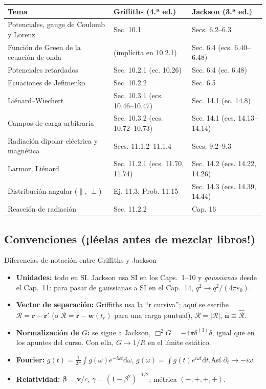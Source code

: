\documentclass[11pt,a4paper]{article}
\newcommand{\Rv}{\bm{\mathcal R}}
\newcommand{\Rs}{\mathcal R}
\newcommand{\Rh}{\hat{\bm{\mathcal R}}}
\newcommand{\nh}{\hat{\mathbf n}}
\newcommand{\bv}{\mathbf v}
\newcommand{\rr}{\mathbf r}
\newcommand{\dd}{\mathrm d}
\newcommand{\boxop}{\Box^2}
\newcommand{\bbeta}{\bm\beta}
\theoremstyle{remark}
\begin{document}
\begin{center}
\renewcommand{\arraystretch}{1.25}
\begin{tabularx}{\textwidth}{>{\raggedright}p{5.2cm}>{\raggedright}X>{\raggedright\arraybackslash}X}
\toprule
\textbf{Tema} & \textbf{Griffiths (4.ª ed.)} & \textbf{Jackson (3.ª ed.)}\\
\midrule
Potenciales, gauge de Coulomb y Lorenz & Sec. 10.1 & Secs. 6.2--6.3\\
Función de Green de la ecuación de onda & (implícita en 10.2.1) & Sec. 6.4 (ecs. 6.40--6.48)\\
Potenciales retardados & Sec. 10.2.1 (ec. 10.26) & Sec. 6.4 (ec. 6.48)\\
Ecuaciones de Jefimenko & Sec. 10.2.2 & Sec. 6.5\\
Liénard--Wiechert & Sec. 10.3.1 (ecs. 10.46--10.47) & Sec. 14.1 (ec. 14.8)\\
Campos de carga arbitraria & Sec. 10.3.2 (ecs. 10.72--10.73) & Sec. 14.1 (ecs. 14.13--14.14)\\
Radiación dipolar eléctrica y magnética & Secs. 11.1.2--11.1.4 & Secs. 9.2--9.3\\
Larmor, Liénard & Sec. 11.2.1 (ecs. 11.70, 11.74) & Sec. 14.2 (ecs. 14.22, 14.26)\\
Distribución angular ($\parallel$, $\perp$) & Ej. 11.3; Prob. 11.15 & Sec. 14.3 (ecs. 14.39, 14.44)\\
Reacción de radiación & Sec. 11.2.2 & Cap. 16\\
\bottomrule
\end{tabularx}
\end{center}

\subsection{Convenciones (¡léelas antes de mezclar libros!)}

\begin{warnbox}{Diferencias de notación entre Griffiths y Jackson}
\begin{itemize}[itemsep=0.2em,leftmargin=1.2em]
\item \textbf{Unidades:} todo en SI. Jackson usa SI en los Caps.~1--10 y \emph{gaussianas} desde el
Cap.~11: para pasar de gaussianas a SI en el Cap.~14, $q^2\to q^2/(4\pi\varepsilon_0)$.
\item \textbf{Vector de separación:} Griffiths usa la ``r cursiva''; aquí se escribe
$\Rv=\rr-\rr'$ (o $\Rv=\rr-\mathbf w(t_r)$ para una carga puntual), $\Rs=|\Rv|$, $\nh\equiv\Rh$.
\item \textbf{Normalización de $G$:} se sigue a Jackson, $\boxop G=-4\pi\delta^{(3)}\delta$, igual
que en los apuntes del curso. Con ella, $G\to1/R$ en el límite estático.
\item \textbf{Fourier:} $g(t)=\frac1{2\pi}\int g(\omega)e^{-i\omega t}\dd\omega$,\quad
$g(\omega)=\int g(t)e^{i\omega t}\dd t$.\quad Así $\partial_t\to-i\omega$.
\item \textbf{Relatividad:} $\bbeta=\bv/c$, $\gamma=(1-\beta^2)^{-1/2}$; métrica $(-,+,+,+)$.
\end{itemize}
\end{warnbox}
\end{document}

